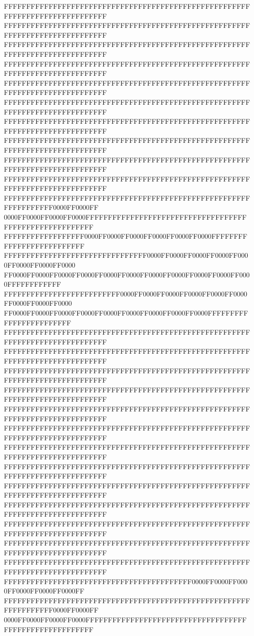 FFFFFFFFFFFFFFFFFFFFFFFFFFFFFFFFFFFFFFFFFFFFFFFFFFFFFFFFFFFFFFFFFFFFFFFFFFFFFF
FFFFFFFFFFFFFFFFFFFFFFFFFFFFFFFFFFFFFFFFFFFFFFFFFFFFFFFFFFFFFFFFFFFFFFFFFFFFFF
FFFFFFFFFFFFFFFFFFFFFFFFFFFFFFFFFFFFFFFFFFFFFFFFFFFFFFFFFFFFFFFFFFFFFFFFFFFFFF
FFFFFFFFFFFFFFFFFFFFFFFFFFFFFFFFFFFFFFFFFFFFFFFFFFFFFFFFFFFFFFFFFFFFFFFFFFFFFF
FFFFFFFFFFFFFFFFFFFFFFFFFFFFFFFFFFFFFFFFFFFFFFFFFFFFFFFFFFFFFFFFFFFFFFFFFFFFFF
FFFFFFFFFFFFFFFFFFFFFFFFFFFFFFFFFFFFFFFFFFFFFFFFFFFFFFFFFFFFFFFFFFFFFFFFFFFFFF
FFFFFFFFFFFFFFFFFFFFFFFFFFFFFFFFFFFFFFFFFFFFFFFFFFFFFFFFFFFFFFFFFFFFFFFFFFFFFF
FFFFFFFFFFFFFFFFFFFFFFFFFFFFFFFFFFFFFFFFFFFFFFFFFFFFFFFFFFFFFFFFFFFFFFFFFFFFFF
FFFFFFFFFFFFFFFFFFFFFFFFFFFFFFFFFFFFFFFFFFFFFFFFFFFFFFFFFFFFFFFFFFFFFFFFFFFFFF
FFFFFFFFFFFFFFFFFFFFFFFFFFFFFFFFFFFFFFFFFFFFFFFFFFFFFFFFFFFFFFFFFFFFFFFFFFFFFF
FFFFFFFFFFFFFFFFFFFFFFFFFFFFFFFFFFFFFFFFFFFFFFFFFFFFFFFFFFFFFFFFFF0000FF0000FF
0000FF0000FF0000FF0000FFFFFFFFFFFFFFFFFFFFFFFFFFFFFFFFFFFFFFFFFFFFFFFFFFFFFFFF
FFFFFFFFFFFFFFFFFF0000FF0000FF0000FF0000FF0000FF0000FFFFFFFFFFFFFFFFFFFFFFFFFF
FFFFFFFFFFFFFFFFFFFFFFFFFFFFFFFF0000FF0000FF0000FF0000FF0000FF0000FF0000FF0000
FF0000FF0000FF0000FF0000FF0000FF0000FF0000FF0000FF0000FF0000FF0000FFFFFFFFFFFF
FFFFFFFFFFFFFFFFFFFFFFFFFF0000FF0000FF0000FF0000FF0000FF0000FF0000FF0000FF0000
FF0000FF0000FF0000FF0000FF0000FF0000FF0000FF0000FF0000FFFFFFFFFFFFFFFFFFFFFFFF
FFFFFFFFFFFFFFFFFFFFFFFFFFFFFFFFFFFFFFFFFFFFFFFFFFFFFFFFFFFFFFFFFFFFFFFFFFFFFF
FFFFFFFFFFFFFFFFFFFFFFFFFFFFFFFFFFFFFFFFFFFFFFFFFFFFFFFFFFFFFFFFFFFFFFFFFFFFFF
FFFFFFFFFFFFFFFFFFFFFFFFFFFFFFFFFFFFFFFFFFFFFFFFFFFFFFFFFFFFFFFFFFFFFFFFFFFFFF
FFFFFFFFFFFFFFFFFFFFFFFFFFFFFFFFFFFFFFFFFFFFFFFFFFFFFFFFFFFFFFFFFFFFFFFFFFFFFF
FFFFFFFFFFFFFFFFFFFFFFFFFFFFFFFFFFFFFFFFFFFFFFFFFFFFFFFFFFFFFFFFFFFFFFFFFFFFFF
FFFFFFFFFFFFFFFFFFFFFFFFFFFFFFFFFFFFFFFFFFFFFFFFFFFFFFFFFFFFFFFFFFFFFFFFFFFFFF
FFFFFFFFFFFFFFFFFFFFFFFFFFFFFFFFFFFFFFFFFFFFFFFFFFFFFFFFFFFFFFFFFFFFFFFFFFFFFF
FFFFFFFFFFFFFFFFFFFFFFFFFFFFFFFFFFFFFFFFFFFFFFFFFFFFFFFFFFFFFFFFFFFFFFFFFFFFFF
FFFFFFFFFFFFFFFFFFFFFFFFFFFFFFFFFFFFFFFFFFFFFFFFFFFFFFFFFFFFFFFFFFFFFFFFFFFFFF
FFFFFFFFFFFFFFFFFFFFFFFFFFFFFFFFFFFFFFFFFFFFFFFFFFFFFFFFFFFFFFFFFFFFFFFFFFFFFF
FFFFFFFFFFFFFFFFFFFFFFFFFFFFFFFFFFFFFFFFFFFFFFFFFFFFFFFFFFFFFFFFFFFFFFFFFFFFFF
FFFFFFFFFFFFFFFFFFFFFFFFFFFFFFFFFFFFFFFFFFFFFFFFFFFFFFFFFFFFFFFFFFFFFFFFFFFFFF
FFFFFFFFFFFFFFFFFFFFFFFFFFFFFFFFFFFFFFFFFFFFFFFFFFFFFFFFFFFFFFFFFFFFFFFFFFFFFF
FFFFFFFFFFFFFFFFFFFFFFFFFFFFFFFFFFFFFFFFFF0000FF0000FF0000FF0000FF0000FF0000FF
FFFFFFFFFFFFFFFFFFFFFFFFFFFFFFFFFFFFFFFFFFFFFFFFFFFFFFFFFFFFFFFFFF0000FF0000FF
0000FF0000FF0000FF0000FFFFFFFFFFFFFFFFFFFFFFFFFFFFFFFFFFFFFFFFFFFFFFFFFFFFFFFF
